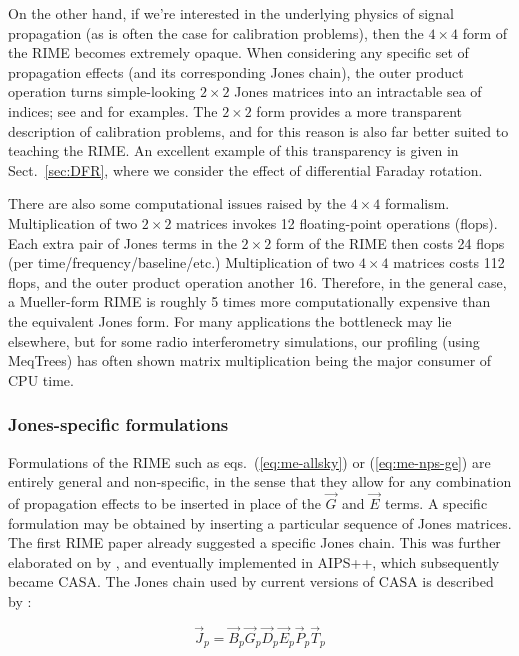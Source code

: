 \documentclass[]{aa}
\newcommand{\jones}[2]{\vec {#1}_{#2}}
\begin{document}
On the other hand, if we're interested in the underlying physics of signal propagation (as is often the case for calibration problems), then the $4\times4$ form of the RIME becomes extremely opaque. When considering any specific set of propagation effects (and its corresponding Jones chain), the outer product operation turns simple-looking $2\times2$ Jones matrices into an intractable sea of indices; see \citet[eq. 4]{SB:imageplane} and \citet[Appendix A]{ME1} for examples. The $2\times2$ form provides a more transparent description of calibration problems, and for this reason is also far better suited to teaching the RIME. An excellent example of this transparency is given in Sect.~\ref{sec:DFR}, where we consider the effect of differential Faraday rotation.

There are also some computational issues raised by the $4\times4$ formalism. Multiplication of two $2\times2$ matrices invokes 12 floating-point operations (flops). Each extra pair of Jones terms in the $2\times2$ form of the RIME then costs 24 flops (per time/frequency/baseline/etc.) Multiplication of two $4\times4$ matrices costs 112 flops, and the outer product operation another 16. Therefore, in the general case, a Mueller-form RIME is roughly 5 times more computationally expensive than the equivalent Jones form. For many applications the bottleneck may lie elsewhere, but for some radio interferometry simulations, our profiling (using MeqTrees) has often shown matrix multiplication being the major consumer of CPU time.

\subsubsection{Jones-specific formulations\label{sec:jones-specific}} 

Formulations of the RIME such as eqs.~(\ref{eq:me-allsky}) or (\ref{eq:me-nps-ge}) are entirely general and non-specific, in the sense that they allow for any combination of propagation effects to be inserted in place of the $\jones{G}{}$ and $\jones{E}{}$ terms. A specific formulation may be obtained by inserting a particular sequence of Jones matrices. The first RIME paper \citep{ME1} already suggested a specific Jones chain. This was further elaborated on by \citet{JEN:note185}, and eventually implemented in AIPS++, which subsequently became CASA. The Jones chain used by current versions of CASA is described by \citet[Appendix E.1]{CASA:UserRef}:

\begin{equation}\label{eq:casa}
\jones{J}{p} = \jones{B}{p} \jones{G}{p} \jones{D}{p} \jones{E}{p} \jones{P}{p} \vec  T_p
\end{equation}
\end{document}
